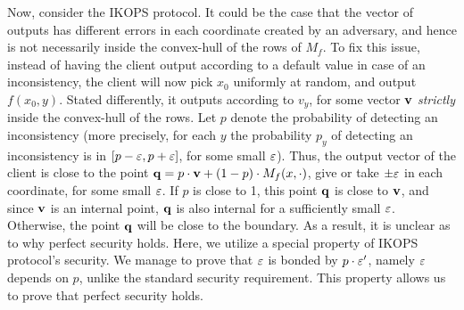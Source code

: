 \documentclass{llncs}
\newcommand{\Y}{\mathcal{Y}}
\renewcommand{\q}{\myvec{q}}
\renewcommand{\v}{\myvec{v}}
\newcommand{\Out}{\operatorname{Out}}
\begin{document}
Now, consider the IKOPS protocol. It could be the case that the vector of outputs has different errors in each coordinate created by an adversary, and hence is not necessarily inside the convex-hull of the rows of $M_f$. To fix this issue, instead of having the client output according to a default value in case of an inconsistency, the client will now pick $x_0$ uniformly at random, and output $f(x_0,y)$. Stated differently, it outputs according to $v_y$, for some vector $\v$ \emph{strictly} inside the convex-hull of the rows. 
Let $p$ denote the probability of detecting an inconsistency
(more precisely, for each $y$ the probability $p_y$ of detecting an inconsistency is in $[p-\varepsilon,p+\varepsilon]$, for some small $\varepsilon$).
Thus, the output vector of the client is close to the point $\q=p\cdot \v + (1-p)\cdot M_f(x,\cdot)$, give or take $\pm \varepsilon$ in each coordinate, for some small $\varepsilon$.
If $p$ is close to 1, this point $\q$ is close to $\v$, and since $\v$ is an internal point, $\q$ is also internal for a sufficiently small $\varepsilon$. Otherwise, the point $\q$ will be close to the boundary. As a result, it is unclear as to why perfect security holds. Here, we utilize a special property of IKOPS protocol's security. We manage to prove that $\varepsilon$ is bonded by $p\cdot \varepsilon'$, namely $\varepsilon$ depends on $p$, unlike the standard security requirement. This property allows us to prove that perfect security holds.

\end{document}
